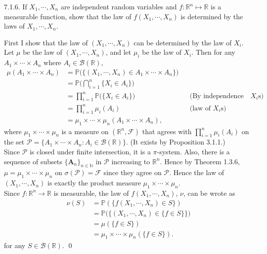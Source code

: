 \begin{exercise}7.1.6. If $X_1,\cdots, X_n$ are independent random variables and $f:\mathbb{R}^n\mapsto\mathbb{R}$ is a measurable function, show that the law of $f(X_1,\cdots, X_n)$ is determined by the laws of $X_1,\cdots, X_n$.
\end{exercise}

\begin{answer}
    First I show that the law of $(X_1,\cdots,X_n)$ can be determined by the law of $X_i$. Let $\mu$ be the law of $(X_1,\cdots,X_n)$, and let $\mu_i$ be the law of $X_i$. Then for any $A_1\times\cdots\times A_n$ where $A_i\in\mathcal{B}(\mathbb{R})$,
    \begin{equation*}
        \begin{aligned}
            \mu(A_1\times\cdots\times A_n)&=\mathbb{P}\big(\{(X_1,\cdots,X_n)\in A_1\times\cdots\times A_n\}\big) \\
            &=\mathbb{P}\Big(\bigcap^n_{i=1}\{X_i\in A_i\}\Big) \\
            &= \prod^n_{i=1}\mathbb{P}\big(\{X_i\in A_i\}\big) && \text{(By independence of $X_i$s)} \\
            &=\prod^n_{i=1}\mu_i(A_i) && \text{(law of $X_i$s)}\\
            &=\mu_1\times\cdots\times\mu_n(A_1\times\cdots\times A_n),
        \end{aligned}
    \end{equation*}
    where $\mu_1\times\cdots\times\mu_n$ is a measure on $(\mathbb{R}^n, \mathcal{F})$ that agrees with $\prod^n_{i=1}\mu_i(A_i)$ on the set $\mathcal{P} = \{A_1\times\cdots\times A_n:A_i\in\mathcal{B}(\mathbb{R})\}$. (It exists by Proposition 3.1.1.)\\
    Since $\mathcal{P}$ is closed under finite intersection, it is a $\pi$-system. Also, there is a sequence of subsets $\{\mathbf{A}_n\}_{n\in\mathbb{N}}$ in $\mathcal{P}$ increasing to $\mathbb{R}^n$. Hence by Theorem 1.3.6, $\mu=\mu_1\times\cdots\times\mu_n$ on $\sigma(\mathcal{P})=\mathcal{F}$ since they agree on $\mathcal{P}$. Hence the law of $(X_1,\cdots,X_n)$ is exactly the product measure $\mu_1\times\cdots\times\mu_n$.\\
    Since $f:\mathbb{R}^n\rightarrow\mathbb{R}$ is measurable, the law of $f(X_1,\cdots,X_n)$, $\nu$, can be wrote as
    \begin{equation*}
        \begin{aligned}
                    \nu(S) &= \mathbb{P}(\{f(X_1,\cdots,X_n)\in S\}) \\
                    &= \mathbb{P}\big(\big\{(X_1,\cdots,X_n)\in \{f\in S\}\big\}\big) \\
                    &= \mu(\{f\in S\}) \\
                    &= \mu_1\times\cdots\times\mu_n(\{f\in S\}).
        \end{aligned}
    \end{equation*}
    for any $S\in\mathcal{B}(\mathbb{R})$. 
        \qquad \qed

\end{answer}
